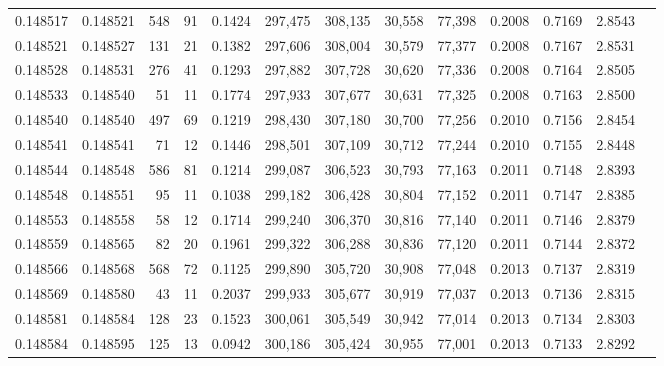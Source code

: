 \begin{tabular}{rrrrrrrrrrrrr}
0.148517 & 0.148521 &   548 &  91 &                                     0.1424 & 297,475 & 308,135 &  30,558 &  77,398 & 0.2008 & 0.7169 & 2.8543 \\
0.148521 & 0.148527 &   131 &  21 &                                     0.1382 & 297,606 & 308,004 &  30,579 &  77,377 & 0.2008 & 0.7167 & 2.8531 \\
0.148528 & 0.148531 &   276 &  41 &                                     0.1293 & 297,882 & 307,728 &  30,620 &  77,336 & 0.2008 & 0.7164 & 2.8505 \\
0.148533 & 0.148540 &    51 &  11 &                                     0.1774 & 297,933 & 307,677 &  30,631 &  77,325 & 0.2008 & 0.7163 & 2.8500 \\
0.148540 & 0.148540 &   497 &  69 &                                     0.1219 & 298,430 & 307,180 &  30,700 &  77,256 & 0.2010 & 0.7156 & 2.8454 \\
0.148541 & 0.148541 &    71 &  12 &                                     0.1446 & 298,501 & 307,109 &  30,712 &  77,244 & 0.2010 & 0.7155 & 2.8448 \\
0.148544 & 0.148548 &   586 &  81 &                                     0.1214 & 299,087 & 306,523 &  30,793 &  77,163 & 0.2011 & 0.7148 & 2.8393 \\
0.148548 & 0.148551 &    95 &  11 &                                     0.1038 & 299,182 & 306,428 &  30,804 &  77,152 & 0.2011 & 0.7147 & 2.8385 \\
0.148553 & 0.148558 &    58 &  12 &                                     0.1714 & 299,240 & 306,370 &  30,816 &  77,140 & 0.2011 & 0.7146 & 2.8379 \\
0.148559 & 0.148565 &    82 &  20 &                                     0.1961 & 299,322 & 306,288 &  30,836 &  77,120 & 0.2011 & 0.7144 & 2.8372 \\
0.148566 & 0.148568 &   568 &  72 &                                     0.1125 & 299,890 & 305,720 &  30,908 &  77,048 & 0.2013 & 0.7137 & 2.8319 \\
0.148569 & 0.148580 &    43 &  11 &                                     0.2037 & 299,933 & 305,677 &  30,919 &  77,037 & 0.2013 & 0.7136 & 2.8315 \\
0.148581 & 0.148584 &   128 &  23 &                                     0.1523 & 300,061 & 305,549 &  30,942 &  77,014 & 0.2013 & 0.7134 & 2.8303 \\
0.148584 & 0.148595 &   125 &  13 &                                     0.0942 & 300,186 & 305,424 &  30,955 &  77,001 & 0.2013 & 0.7133 & 2.8292 \\

\end{tabular}
